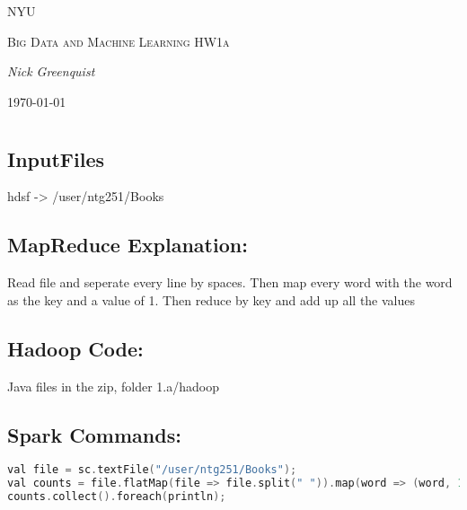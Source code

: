 
\begin{titlepage}
    \centering
    \vfill
    {\scshape\LARGE NYU \par}
    {\scshape\Large Big Data and Machine Learning HW1a\par}
    {\Large\itshape Nick Greenquist\par}
    \vfill
    
    {\large \today\par}
\end{titlepage}


\section*{}
\subsection*{InputFiles}
hdsf -> /user/ntg251/Books

\subsection*{MapReduce Explanation:}
Read file and seperate every line by spaces. Then map every word with the word as the key and a value of 1. Then reduce by key and add up all the values

\subsection*{Hadoop Code:}
Java files in the zip, folder 1.a/hadoop

\subsection*{Spark Commands:}
\begin{lstlisting}[language=c++]
val file = sc.textFile("/user/ntg251/Books");
val counts = file.flatMap(file => file.split(" ")).map(word => (word, 1)).reduceByKey(_ + _);
counts.collect().foreach(println);
\end{lstlisting}

